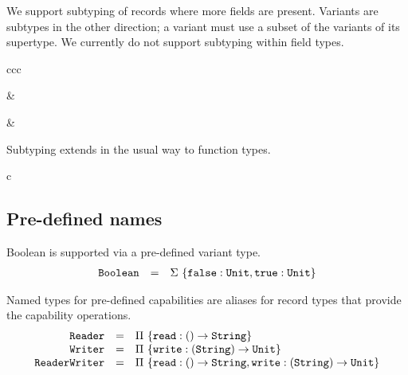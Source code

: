 \documentclass[11pt]{article}
\newcommand{\kw}[1]{\mathtt{#1}}
\begin{document}
We support subtyping of records where more fields are present.
Variants are subtypes in the other direction; a variant must use a subset of the variants of its supertype.
We currently do not support subtyping within field types.


\begin{rules}{ccc}


&


&


\end{rules}

Subtyping extends in the usual way to function types.

\begin{rules}{c}


\end{rules}

\subsection{Pre-defined names}

Boolean is supported via a pre-defined variant type.
\[
\begin{array}{rcl}
\kw{Boolean} & = &
\varty{\{ \kw{false} : \unity, \kw{true} : \unity \}} \\
\end{array}
\]

Named types for pre-defined capabilities are aliases for record types that provide the capability operations.
\[
\begin{array}{rcl}
\kw{Reader} & = &
\recty{\{ \kw{read} : \funty{}{\strty} \}} \\

\kw{Writer} & = &
\recty{\{ \kw{write} : \funty{\strty}{\unity} \}} \\

\kw{ReaderWriter} & = &
\recty{\{ \kw{read} : \funty{}{\strty}, \kw{write} : \funty{\strty}{\unity} \}}
\end{array}
\]
\end{document}
